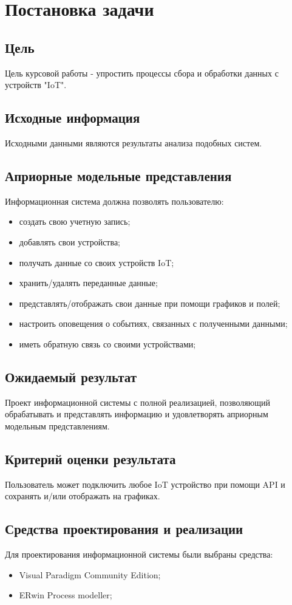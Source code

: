 \documentclass[12pt]{article}
\begin{document}
    \section{Постановка задачи}
    \subsection{Цель}
    Цель курсовой работы - упростить процессы сбора и обработки данных с устройств "IoT".
    \subsection{Исходные информация}
    Исходными данными являются результаты анализа подобных систем.
    \subsection{Априорные модельные представления}
    Информационная система должна позволять пользователю:
    \begin{itemize}
        \item создать свою учетную запись;
        \item добавлять свои устройства;
        \item получать данные со своих устройств IoT;
        \item хранить/удалять переданные данные;
        \item представлять/отображать свои данные при помощи графиков и полей;
        \item настроить оповещения о событиях, связанных с полученными данными;
        \item иметь обратную связь со своими устройствами;
    \end{itemize}
    \subsection{Ожидаемый результат}
    Проект информационной системы с полной реализацией, позволяющий обрабатывать и представлять информацию
    и удовлетворять априорным модельным представлениям.
    \subsection{Критерий оценки результата}
    Пользователь может подключить любое IoT устройство при помощи API и сохранять и/или отображать на графиках.
    \subsection{Средства проектирования и реализации}
    Для проектирования информационной системы были выбраны средства:
    \begin{itemize}
        \item Visual Paradigm Community Edition;
        \item ERwin Process modeller;
    \end{itemize}
\end{document}
